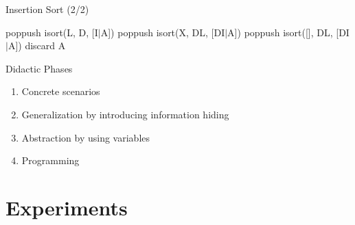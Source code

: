 \begin{frame}{Insertion Sort (2/2)}
  \begin{enumerate}
     \small{ {poppush} {isort(L, D, [I$|$A])}}
     \small{ {poppush}
      \newline\;\; {isort(X, DL, [DI$|$A])}}
     \small{ {poppush} {isort([], DL, [DI$|$A])}}
     \small{ {discard} {A}}
  \end{enumerate}
\end{frame}

\begin{frame}{Didactic Phases}
  \begin{enumerate}
  \item Concrete scenarios
  \item Generalization by introducing information hiding
  \item Abstraction by using variables
  \item Programming
  \end{enumerate}
\end{frame}

\section{Experiments}

